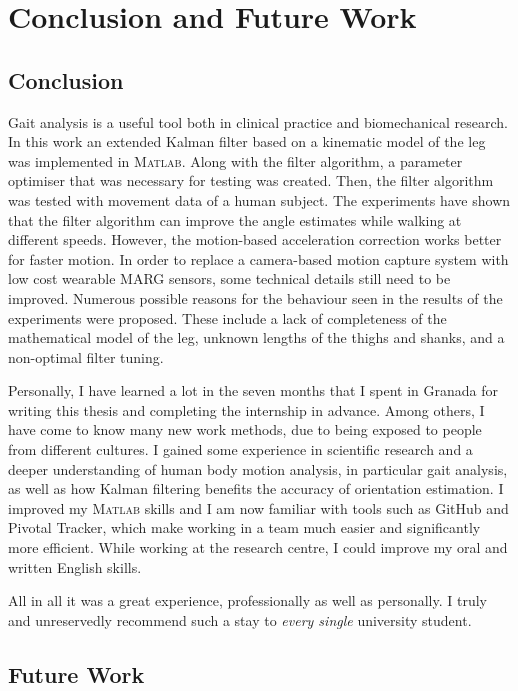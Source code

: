 \chapter{Conclusion and Future Work}
\label{ch:Conclusion and Future Work}

\section{Conclusion}

Gait analysis is a useful tool both in clinical practice and biomechanical research. In this work an extended Kalman filter based on a kinematic model of the leg was implemented in \textsc{Matlab}\textsuperscript{\textregistered}. Along with the filter algorithm, a parameter optimiser that was necessary for testing was created. Then, the filter algorithm was tested with movement data of a human subject. The experiments have shown that the filter algorithm can improve the angle estimates while walking at different speeds.
However, the motion-based acceleration correction works better for faster motion. In order to replace a camera-based motion capture system with low cost wearable MARG sensors, some technical details still need to be improved. Numerous possible reasons for the behaviour seen in the results of the experiments were proposed. These include a lack of completeness of the mathematical model of the leg, unknown lengths of the thighs and shanks, and a non-optimal filter tuning.

Personally, I have learned a lot in the seven months that I spent in Granada for writing this thesis and completing the internship in advance. Among others, I have come to know many new work methods, due to being exposed to people from different cultures. I gained some experience in scientific research and a deeper understanding of human body motion analysis, in particular gait analysis, as well as how Kalman filtering benefits the accuracy of orientation estimation. I improved my \textsc{Matlab}\textsuperscript{\textregistered} skills and I am now familiar with tools such as GitHub and Pivotal Tracker, which make working in a team much easier and significantly more efficient.  While working at the research centre, I could improve my oral and written English skills.

All in all it was a great experience, professionally as well as personally. I truly and unreservedly recommend such a stay to \emph{every single} university student.

\section{Future Work}

